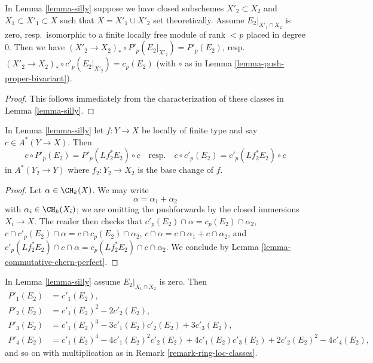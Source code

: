 \begin{lemma}
\label{lemma-silly-shrink}
In Lemma \ref{lemma-silly} suppose we have closed subschemes
$X'_2 \subset X_2$ and $X_1 \subset X'_1 \subset X$ such that
$X = X'_1 \cup X'_2$ set theoretically. Assume $E_2|_{X'_1 \cap X_2}$
is zero, resp.\ isomorphic to a finite locally free module
of rank $< p$ placed in degree $0$. Then we have
$(X'_2 \to X_2)_* \circ P'_p(E_2|_{X'_2}) = P'_p(E_2)$,
resp.\  $(X'_2 \to X_2)_* \circ c'_p(E_2|_{X'_2}) = c_p(E_2)$
(with $\circ$ as in Lemma \ref{lemma-push-proper-bivariant}).
\end{lemma}

\begin{proof}
This follows immediately from the characterization of these classes
in Lemma \ref{lemma-silly}.
\end{proof}

\begin{lemma}
\label{lemma-silly-commutes}
In Lemma \ref{lemma-silly} let $f : Y \to X$ be locally of finite type
and say $c \in A^*(Y \to X)$. Then
$$
c \circ P'_p(E_2) = P'_p(Lf_2^*E_2) \circ c
\quad\text{resp.}\quad
c \circ c'_p(E_2) = c'_p(Lf_2^*E_2) \circ c
$$
in $A^*(Y_2 \to Y)$ where $f_2 : Y_2 \to X_2$ is the base change of $f$.
\end{lemma}

\begin{proof}
Let $\alpha \in \CH_k(X)$. We may write
$$
\alpha = \alpha_1 + \alpha_2
$$
with $\alpha_i \in \CH_k(X_i)$; we are omitting the pushforwards
by the closed immersions $X_i \to X$. The reader then checks that
$c'_p(E_2) \cap \alpha = c_p(E_2) \cap \alpha_2$,
$c \cap c'_p(E_2) \cap \alpha = c \cap c_p(E_2) \cap \alpha_2$,
$c \cap \alpha = c \cap \alpha_1 + c \cap \alpha_2$, and
$c'_p(Lf_2^*E_2) \cap c \cap \alpha = c_p(Lf_2^*E_2) \cap c \cap \alpha_2$.
We conclude by Lemma \ref{lemma-commutative-chern-perfect}.
\end{proof}

\begin{lemma}
\label{lemma-silly-compose}
In Lemma \ref{lemma-silly} assume $E_2|_{X_1 \cap X_2}$ is zero. Then
\begin{align*}
P'_1(E_2) & = c'_1(E_2), \\
P'_2(E_2) & = c'_1(E_2)^2 - 2c'_2(E_2), \\
P'_3(E_2) & = c'_1(E_2)^3 - 3c'_1(E_2)c'_2(E_2) + 3c'_3(E_2), \\
P'_4(E_2) & = c'_1(E_2)^4 - 4c'_1(E_2)^2c'_2(E_2) +
4c'_1(E_2)c'_3(E_2) + 2c'_2(E_2)^2 - 4c'_4(E_2),
\end{align*}
and so on with multiplication as in Remark \ref{remark-ring-loc-classes}.
\end{lemma}

